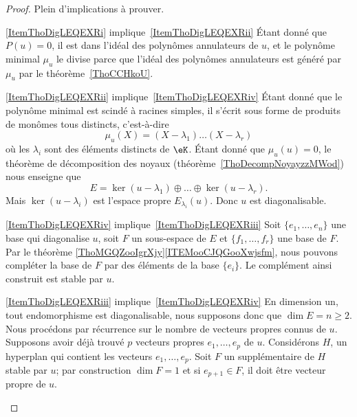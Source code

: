 \begin{proof}
    Plein d'implications à prouver.
    \begin{subproof}
    \item[\ref{ItemThoDigLEQEXRi} implique~\ref{ItemThoDigLEQEXRii}] Étant donné que \( P(u)=0\), il est dans l'idéal des polynômes annulateurs de \( u\), et le polynôme minimal \( \mu_u\) le divise parce que l'idéal des polynômes annulateurs est généré par \( \mu_u\) par le théorème~\ref{ThoCCHkoU}.

    \item[\ref{ItemThoDigLEQEXRii} implique~\ref{ItemThoDigLEQEXRiv}] Étant donné que le polynôme minimal est scindé à racines simples, il s'écrit sous forme de produits de monômes tous distincts, c'est-à-dire
    \begin{equation}
        \mu_u(X)=(X-\lambda_1)\ldots(X-\lambda_r)
    \end{equation}
    où les \( \lambda_i\) sont des éléments distincts de \( \eK\). Étant donné que \( \mu_u(u)=0\), le théorème de décomposition des noyaux (théorème~\ref{ThoDecompNoyayzzMWod}) nous enseigne que
    \begin{equation}
        E=\ker(u-\lambda_1)\oplus\ldots\oplus\ker(u-\lambda_r).
    \end{equation}
    Mais \( \ker(u-\lambda_i)\) est l'espace propre \( E_{\lambda_i}(u)\). Donc \( u\) est diagonalisable.

    \item[\ref{ItemThoDigLEQEXRiv} implique~\ref{ItemThoDigLEQEXRiii}] Soit \( \{ e_1,\ldots, e_n \}\) une base qui diagonalise \( u\), soit \( F\) un sous-espace de \( E\) et \( \{ f_1,\ldots, f_r \}\) une base de \( F\). Par le théorème \ref{ThoMGQZooIgrXjy}\ref{ITEMooCJQGooXwjsfm}, nous pouvons compléter la base de \( F\) par des éléments de la base \( \{ e_i \}\). Le complément ainsi construit est stable par \( u\).

    \item[\ref{ItemThoDigLEQEXRiii} implique~\ref{ItemThoDigLEQEXRiv}] En dimension un, tout endomorphisme est diagonalisable, nous supposons donc que \( \dim E=n\geq 2\). Nous procédons par récurrence sur le nombre de vecteurs propres connus de \( u\). Supposons avoir déjà trouvé \( p\) vecteurs propres \( e_1,\ldots, e_p\) de \( u\). Considérons \( H\), un hyperplan qui contient les vecteurs \( e_1,\ldots, e_p\). Soit \( F\) un supplémentaire de \( H\) stable par \( u\); par construction \( \dim F=1\) et si \( e_{p+1}\in F\), il doit être vecteur propre de \( u\).


\end{subproof}
\end{proof}
